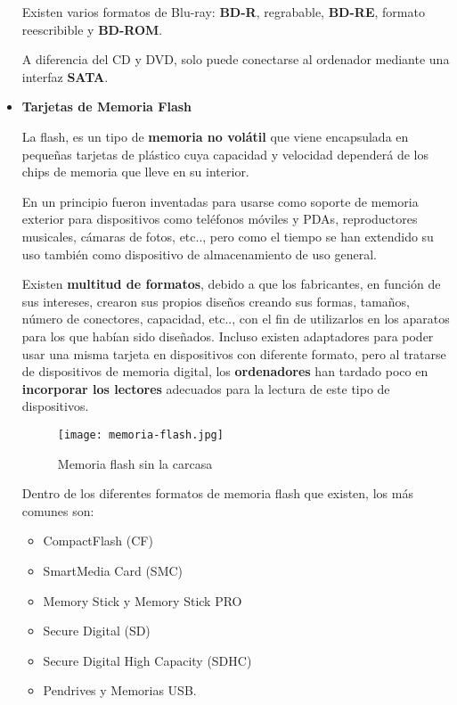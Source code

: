 \begin{itemize}
    Existen varios formatos de Blu-ray: \textbf{BD-R}, regrabable, \textbf{BD-RE}, formato reescribible y \textbf{BD-ROM}.

    A diferencia del CD y DVD, solo puede conectarse al ordenador mediante una interfaz \textbf{SATA}.

    \item \textbf{Tarjetas de Memoria Flash}

    La flash, es un tipo de \textbf{memoria no volátil} que viene encapsulada en pequeñas tarjetas de plástico cuya capacidad y velocidad dependerá de los chips de memoria que lleve en su interior.

    En un principio fueron inventadas para usarse como soporte de memoria exterior para dispositivos como teléfonos móviles y PDAs, reproductores musicales, cámaras de fotos, etc.., pero como el tiempo se han extendido su uso también como dispositivo de almacenamiento de uso general.

    Existen \textbf{multitud de formatos}, debido a que los fabricantes, en función de sus intereses, crearon sus propios diseños creando sus formas, tamaños, número de conectores, capacidad, etc.., con el fin de utilizarlos en los aparatos para los que habían sido diseñados. Incluso existen adaptadores para poder usar una misma tarjeta en dispositivos con diferente formato, pero al tratarse de dispositivos de memoria digital, los \textbf{ordenadores} han tardado poco en \textbf{incorporar los lectores} adecuados para la lectura de este tipo de dispositivos.

    \begin{figure}[ht]
        \centering
        \texttt{[image: memoria-flash.jpg]}
        \caption{Memoria flash sin la carcasa}
    \end{figure}

    Dentro de los diferentes formatos de memoria flash que existen, los más comunes son:

    \begin{itemize}
        \item CompactFlash (CF)
        \item SmartMedia Card (SMC)
        \item Memory Stick y Memory Stick PRO
        \item Secure Digital (SD)
        \item Secure Digital High Capacity (SDHC)
        \item Pendrives y Memorias USB.
    \end{itemize}
\end{itemize}

